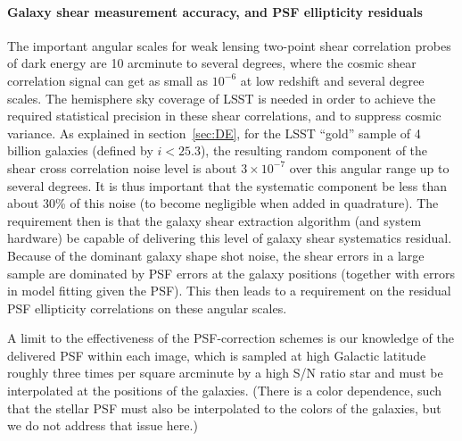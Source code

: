 

\paragraph{Galaxy shear measurement accuracy, and PSF ellipticity residuals\\}
\label{sec:fullEllip}

The important angular scales for weak lensing two-point shear correlation probes of dark
energy are 10 arcminute to several degrees, where the cosmic shear correlation signal can
get as small as $10^{-6}$ at low redshift and several degree scales. The hemisphere sky
coverage of LSST is needed in order to achieve the required statistical precision in these
shear correlations, and to suppress cosmic variance.  As explained in section~\ref{sec:DE},
for the LSST ``gold'' sample of 4 billion galaxies (defined by $i<25.3$), the resulting random
component of the shear cross correlation noise level is about $3\times10^{-7}$ over this
angular range up to several degrees.  It is thus important that the systematic component be
less than about 30\% of this noise (to become negligible when added in quadrature).  The
requirement then is that the galaxy shear extraction algorithm (and system hardware) be
capable of delivering this level of galaxy shear systematics residual.  Because of the dominant
galaxy shape shot noise, the shear errors in a large sample are dominated by PSF errors at the
galaxy positions (together with errors in model fitting given the PSF). This then leads to a
requirement on the residual PSF ellipticity correlations on these angular scales.

A limit to the effectiveness of the PSF-correction schemes is our
knowledge of the delivered PSF within each image, which is sampled
at high Galactic latitude roughly three times per square arcminute by a
high S/N ratio star and must be interpolated at the positions of the
galaxies. (There is a color dependence, such that the stellar PSF must
also be interpolated to the colors of the galaxies, but we do not
address that issue here.)

